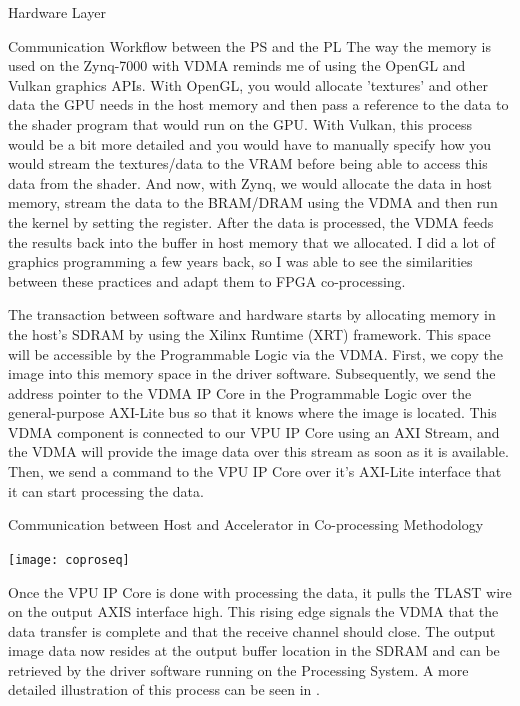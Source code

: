 \documentclass{matthijs}
\begin{document}
\begin{hoofdstuk}{Hardware Layer}
\begin{paragraaf}{Communication Workflow between the PS and the PL}
			The way the memory is used on the Zynq-7000 with VDMA reminds me of using the OpenGL and Vulkan graphics APIs.
			With OpenGL, you would allocate 'textures' and other data the GPU needs in the host memory and then pass a reference to the data to the shader program that would run on the GPU.
			With Vulkan, this process would be a bit more detailed and you would have to manually specify how you would stream the textures/data to the VRAM before being able to access this data from the shader.
			And now, with Zynq, we would allocate the data in host memory, stream the data to the BRAM/DRAM using the VDMA and then run the kernel by setting the register.
			After the data is processed, the VDMA feeds the results back into the buffer in host memory that we allocated.
			I did a lot of graphics programming a few years back, so I was able to see the similarities between these practices and adapt them to FPGA co-processing.
			
			\bigskip

			The transaction between software and hardware starts by allocating memory in the host's SDRAM by using the Xilinx Runtime (XRT) framework.
			This space will be accessible by the Programmable Logic via the VDMA.
			First, we copy the image into this memory space in the driver software.
			Subsequently, we send the address pointer to the VDMA IP Core in the Programmable Logic over the general-purpose AXI-Lite bus so that it knows where the image is located.
			This VDMA component is connected to our VPU IP Core using an AXI Stream, and the VDMA will provide the image data over this stream as soon as it is available.
			Then, we send a command to the VPU IP Core over it's AXI-Lite interface that it can start processing the data.

			\vspace{-1ex}
			\begin{figuur}{Communication between Host and Accelerator in Co-processing Methodology}
				\singlespacing
				\begin{adjustbox}{width=\textwidth,center}
					\texttt{[image: coproseq]}
				\end{adjustbox}
				\onehalfspacing
				\vspace{-3.9ex}
			\end{figuur}
			\vspace{-0.3ex}

			Once the VPU IP Core is done with processing the data, it pulls the TLAST wire on the output AXIS interface high.
			This rising edge signals the VDMA that the data transfer is complete and that the receive channel should close.
			The output image data now resides at the output buffer location in the SDRAM and can be retrieved by the driver software running on the Processing System.
			A more detailed illustration of this process can be seen in .


\end{paragraaf}
\end{hoofdstuk}
\end{document}
